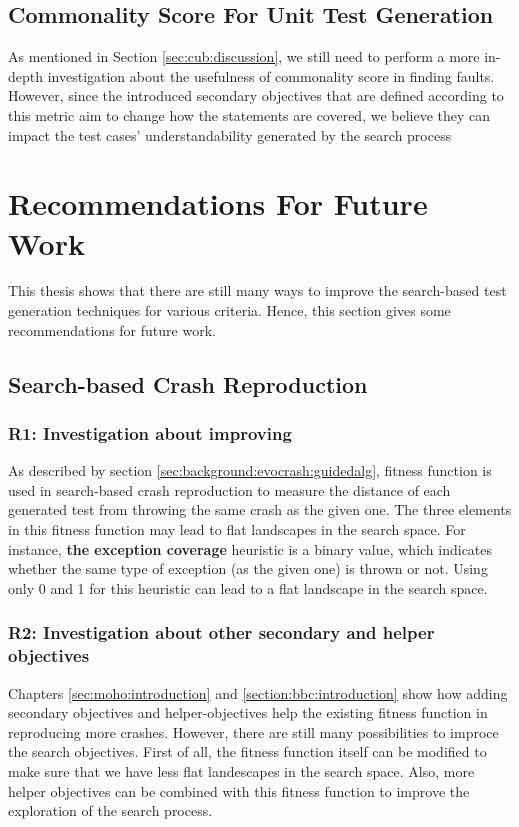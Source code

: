 \subsection{Commonality Score For Unit Test Generation}
As mentioned in Section \ref{sec:cub:discussion}, we still need to perform a more in-depth investigation about the usefulness of commonality score in finding faults. However, since the introduced secondary objectives that are defined according to this metric aim to change how the statements are covered, we believe they can impact the test cases' understandability generated by the search process


\section{Recommendations For Future Work}
This thesis shows that there are still many ways to improve the search-based test generation techniques for various criteria. Hence, this section gives some recommendations for future work.
\subsection{Search-based Crash Reproduction}

\subsubsection{R1: Investigation about improving \CrashFunction}
As described by section \ref{sec:background:evocrash:guidedalg}, \CrashFunction fitness function is used in search-based crash reproduction to measure the distance of each generated test from throwing the same crash as the given one. The three elements in this fitness function may lead to flat landscapes in the search space. For instance, \textbf{the exception coverage} heuristic is a binary value, which indicates whether the same type of exception (as the given one) is thrown or not. Using only 0 and 1 for this heuristic can lead to a flat landscape in the search space.


\subsubsection{R2: Investigation about other secondary and helper objectives}
 Chapters \ref{sec:moho:introduction} and \ref{section:bbc:introduction} show how adding secondary objectives and helper-objectives help the existing \CrashFunction fitness function in reproducing more crashes. However, there are still many possibilities to improce the search objectives. First of all, the \CrashFunction fitness function itself can be modified to make sure that we have less flat landescapes in the search space. Also, more helper objectives can be combined with this fitness function to improve the exploration of the search process.



